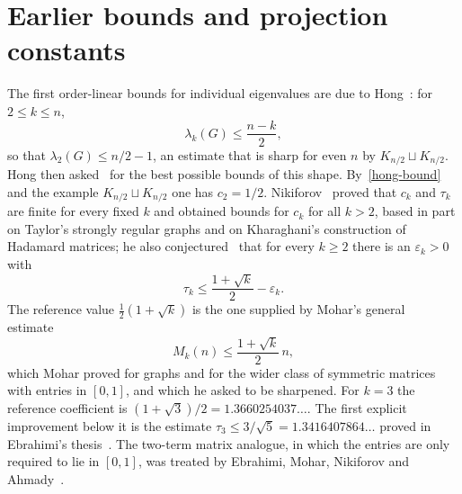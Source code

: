 \section{Earlier bounds and projection constants}\label{sec-history}
The first order-linear bounds for individual eigenvalues are due to
Hong~\cite{Hong88}: for $2\le k\le n$,
\begin{equation}\label{hong-bound}
 \lambda_k(G)\le\frac{n-k}2,
\end{equation}
so that $\lambda_2(G)\le n/2-1$, an estimate that is sharp for even $n$ by
$K_{n/2}\sqcup K_{n/2}$. Hong then asked~\cite{Hong93} for the best possible
bounds of this shape. By~\eqref{hong-bound} and the example $K_{n/2}\sqcup K_{n/2}$ one has
$c_2=1/2$. Nikiforov~\cite{Nik15} proved that $c_k$ and $\tau_k$ are finite
for every fixed $k$ and obtained bounds for $c_k$ for all $k>2$, based in part
on Taylor's strongly regular graphs and on Kharaghani's construction of
Hadamard matrices; he also conjectured~\cite[Conjecture 4.2]{Nik15} that for
every $k\ge2$ there is an $\varepsilon_k>0$ with
\begin{equation}\label{nik-conj}
 \tau_k\le\frac{1+\sqrt k}2-\varepsilon_k .
\end{equation}
The reference value $\tfrac12(1+\sqrt k)$ is the one supplied by Mohar's
general estimate~\cite{Mohar}
\begin{equation}\label{mohar-bound}
 M_k(n)\le\frac{1+\sqrt k}{2}\,n ,
\end{equation}
which Mohar proved for graphs and for the wider class of symmetric matrices
with entries in $[0,1]$, and which he asked to be sharpened. For $k=3$ the
reference coefficient is $(1+\sqrt3)/2=1.3660254037\ldots$. The first explicit
improvement below it is the estimate $\tau_3\le3/\sqrt5=1.3416407864\ldots$
proved in Ebrahimi's thesis~\cite[Theorem 3.4.1]{Ebrahimi}. The two-term
matrix analogue, in which the entries are only required to lie in $[0,1]$, was
treated by Ebrahimi, Mohar, Nikiforov and Ahmady~\cite{EMNA}.

